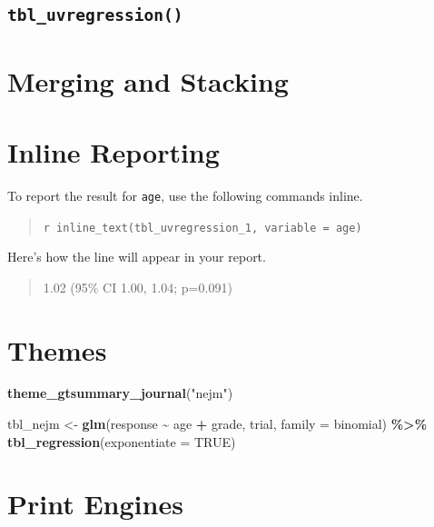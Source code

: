 \documentclass[
]{article}
\newenvironment{Shaded}{\begin{snugshade}}{\end{snugshade}}
\newcommand{\DataTypeTok}[1]{\textcolor[rgb]{0.13,0.29,0.53}{#1}}
\newcommand{\KeywordTok}[1]{\textcolor[rgb]{0.13,0.29,0.53}{\textbf{#1}}}
\newcommand{\NormalTok}[1]{#1}
\newcommand{\OperatorTok}[1]{\textcolor[rgb]{0.81,0.36,0.00}{\textbf{#1}}}
\newcommand{\OtherTok}[1]{\textcolor[rgb]{0.56,0.35,0.01}{#1}}
\newcommand{\StringTok}[1]{\textcolor[rgb]{0.31,0.60,0.02}{#1}}
\begin{document}
\hypertarget{tbl_uvregression}{%
\subsection{\texorpdfstring{\texttt{tbl\_uvregression()}}{tbl\_uvregression()}}\label{tbl_uvregression}}

\hypertarget{merging-and-stacking}{%
\section{Merging and Stacking}\label{merging-and-stacking}}

\hypertarget{inline-reporting}{%
\section{Inline Reporting}\label{inline-reporting}}

To report the result for \texttt{age}, use the following commands
inline.

\begin{quote}
\texttt{\textasciigrave{}r\ inline\_text(tbl\_uvregression\_1,\ variable\ =\ age)\textasciigrave{}}
\end{quote}

Here's how the line will appear in your report.

\begin{quote}
1.02 (95\% CI 1.00, 1.04; p=0.091)
\end{quote}

\hypertarget{themes}{%
\section{Themes}\label{themes}}

\begin{Shaded}
\begin{Highlighting}[]
\KeywordTok{theme\_gtsummary\_journal}\NormalTok{(}\StringTok{"nejm"}\NormalTok{)}

\NormalTok{tbl\_nejm <{-}}
\StringTok{  }\KeywordTok{glm}\NormalTok{(response }\OperatorTok{\textasciitilde{}}\StringTok{ }\NormalTok{age }\OperatorTok{+}\StringTok{ }\NormalTok{grade, trial, }\DataTypeTok{family =}\NormalTok{ binomial) }\OperatorTok{\%>\%}
\StringTok{  }\KeywordTok{tbl\_regression}\NormalTok{(}\DataTypeTok{exponentiate =} \OtherTok{TRUE}\NormalTok{)}
\end{Highlighting}
\end{Shaded}

\hypertarget{print-engines}{%
\section{Print Engines}\label{print-engines}}
\end{document}
